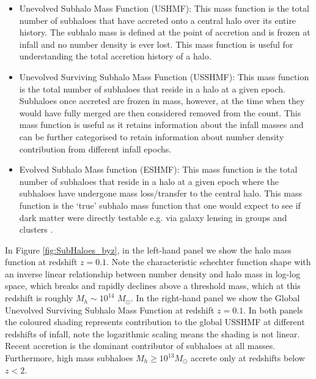 \begin{itemize}
    \item Unevolved Subhalo Mass Function (USHMF): This mass function is the total number of subhaloes that have accreted onto a central halo over its entire history. The subhalo mass is defined at the point of accretion and is frozen at infall and no number density is ever lost. This mass function is useful for understanding the total accretion history of a halo.
    \item Unevolved Surviving Subhalo Mass Function (USSHMF): This mass function is the total number of subhaloes that reside in a halo at a given epoch. Subhaloes once accreted are frozen in mass, however, at the time when they would have fully merged are then considered removed from the count. This mass function is useful as it retains information about the infall masses and can be further categorised to retain information about number density contribution from different infall epochs.
    \item Evolved Subhalo Mass function (ESHMF): This mass function is the total number of subhaloes that reside in a halo at a given epoch where the subhaloes have undergone mass loss/transfer to the central halo. This mass function is the `true' subhalo mass function that one would expect to see if dark matter were directly testable e.g. via galaxy lensing in groups and clusters \cite{Bartelmann2001WeakLensing}.
\end{itemize}

In Figure \ref{fig:SubHaloes_byz}, in the left-hand panel we show the halo mass function at redshift $z=0.1$. Note the characteristic schechter function shape with an inverse linear relationship between number density and halo mass in log-log space, which breaks and rapidly declines above a threshold mass, which at this redshift is roughly $M_h\sim 10^{14}$ $M_{\odot}$. In the right-hand panel we show the Global Unevolved Surviving Subhalo Mass Function at redshift $z=0.1$. In both panels the coloured shading represents contribution to the global USSHMF at different redshifts of infall, note the logarithmic scaling means the shading is not linear. Recent accretion is the dominant contributor of subhaloes at all masses. Furthermore, high mass subhaloes $M_h \geq 10^{13} M_{\odot}$ accrete only at redshifts below $z < 2$.

